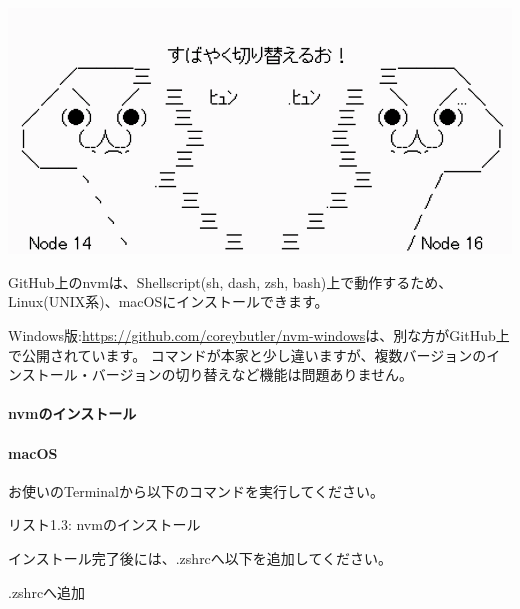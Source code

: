 \begin{reviewimage}[H]%
\includegraphics[width=0.6\maxwidth]{./images/01-createDevEnv/switchNodejs.png}%
\label{image:01-createDevEnv:switchNodejs}
\end{reviewimage}
\vspace*{\baselineskip}

GitHub上のnvmは、Shellscript(sh, dash, zsh, bash)上で動作するため、Linux(UNIX系)、macOSにインストールできます。

\vspace*{\baselineskip}

Windows版:\url{https://github.com/coreybutler/nvm-windows}は、別な方がGitHub上で公開されています。
コマンドが本家と少し違いますが、複数バージョンのインストール・バージョンの切り替えなど機能は問題ありません。

\paragraph*{nvmのインストール}
\paragraph*{macOS}
お使いのTerminalから以下のコマンドを実行してください。

\def\startercodeblockfontsize{}
\begin{starterterminal}[_046801558]{リスト1.3: nvmのインストール}\end{starterterminal}

インストール完了後には、.zshrcへ以下を追加してください。

\def\startercodeblockfontsize{}
\begin{starterterminal}[]{.zshrcへ追加}\end{starterterminal}
\ParagraphEnd

